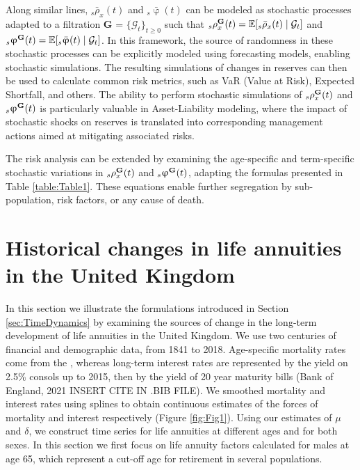 \documentclass[12pt]{article}
\begin{document}
Along similar lines, ${}_s\bar{\rho}_x(t)$ and ${}_s\bar{\upvarphi}(t)$ can be modeled as stochastic processes adapted to a filtration \textbf{G} = $\{\mathcal{G}_t\}_{t \ge 0}$ such that ${}_s{\rho}^{\bf{G}}_x(t) = \mathbb{E}[{}_s\bar{\rho}_x(t) \mid \mathcal{G}_t]$ and ${}_s{\upvarphi}^{\bf{G}}(t) = \mathbb{E}[{}_s\bar{\upvarphi}(t) \mid \mathcal{G}_t]$. In this framework, the source of randomness in these stochastic processes can be explicitly modeled using forecasting models, enabling stochastic simulations. The resulting simulations of changes in reserves can then be used to calculate common risk metrics, such as VaR (Value at Risk), Expected Shortfall, and others. The ability to perform stochastic simulations of ${}_s{\rho}^{\bf{G}}_x(t)$ and ${}_s{\upvarphi}^{\bf{G}}(t)$ is particularly valuable in Asset-Liability modeling, where the impact of stochastic shocks on reserves is translated into corresponding management actions aimed at mitigating associated risks.

The risk analysis can be extended by examining the age-specific and term-specific stochastic variations in ${}_s{\rho}^{\bf{G}}_x(t)$ and ${}_s{\upvarphi}^{\bf{G}}(t)$, adapting the formulas presented in Table \ref{table:Table1}. These equations enable further segregation by sub-population, risk factors, or any cause of death.



\section{Historical changes in life annuities in the United Kingdom}\label{sec:UK_Illustration}

In this section we illustrate the formulations introduced in Section \ref{sec:TimeDynamics} by examining the sources of change in the long-term development of life annuities in the United Kingdom. We use two centuries of financial and demographic data, from 1841 to 2018. Age-specific mortality rates come from the \citep{HMD2020}, whereas long-term interest rates are represented by the yield on 2.5\% consols up to 2015, then by the yield of 20 year maturity bills (Bank of England, 2021 INSERT CITE IN .BIB FILE). We smoothed mortality and interest rates using splines \citep{green1993nonparametric,camarda2012mortalitysmooth} to obtain continuous estimates of the forces of mortality and interest respectively (Figure \ref{fig:Fig1}). Using our estimates of $\mu$ and $\delta$, we construct time series for life annuities at different ages and for both sexes. In this section we first focus on life annuity factors calculated for males at age 65, which represent a cut-off age for retirement in several populations. 
\end{document}
